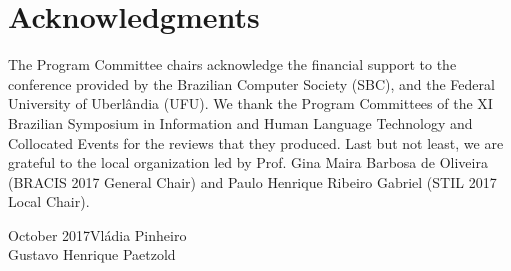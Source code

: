 \section*{Acknowledgments}

The Program Committee chairs acknowledge the financial support to the
conference provided by the Brazilian Computer Society (SBC), and the Federal University of Uberlândia (UFU). We thank the Program Committees of the XI Brazilian Symposium
in Information and Human Language Technology and Collocated Events for
the reviews that they produced. Last but not least, we are grateful to
the local organization led by Prof. Gina Maira Barbosa de Oliveira
(BRACIS 2017 General Chair) and Paulo Henrique Ribeiro Gabriel (STIL 2017 Local
Chair).


\vspace{0.5cm}
\begin{flushright}\noindent
October 2017\hfill  Vl\'adia Pinheiro\\Gustavo Henrique Paetzold
\end{flushright}

